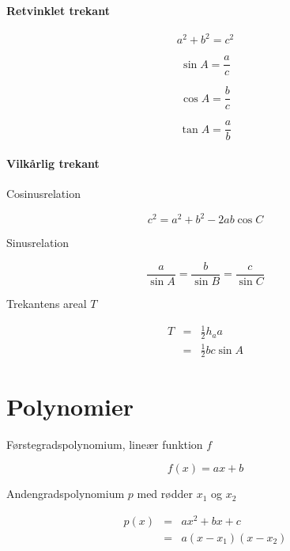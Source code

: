 \documentclass[11pt,a4paper,landscape,twocolumn,fleqn,leqno]{article}
\begin{document}
\paragraph{Retvinklet trekant}

\begin{equation}
a^2 + b^2 = c^2
\end{equation}

\begin{equation}
\sin A = \frac{a}{c}
\end{equation}

\begin{equation}
\cos A = \frac{b}{c}
\end{equation}

\begin{equation}
\tan A = \frac{a}{b}
\end{equation}

\paragraph{Vilkårlig trekant}

Cosinusrelation

\begin{equation}
c^2 = a^2 + b^2 - 2ab\cos C
\end{equation}

Sinusrelation

\begin{equation}
\frac{a}{\sin A} = \frac{b}{\sin B} = \frac{c}{\sin C}
\end{equation}

Trekantens areal $T$

\begin{eqnarray}
T & = & \frac{1}{2}h_a a \\
& = & \frac{1}{2}bc\sin A \nonumber
\end{eqnarray}

\newpage

\section{Polynomier}

Førstegradspolynomium, lineær funktion $f$

\begin{equation}
f(x) = ax+b
\end{equation}

Andengradspolynomium $p$ med rødder $x_1$ og $x_2$

\begin{eqnarray}
p(x) & = & ax^2 + bx + c \\
 & = & a(x-x_1)(x-x_2) \nonumber
\end{eqnarray}
\end{document}
